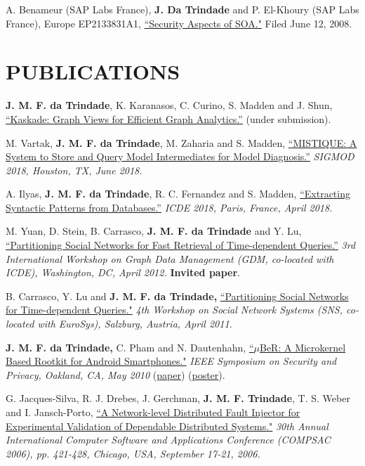 \documentclass[line,margin]{res}
\begin{document}
\begin{resume}
A. Benameur (SAP Labs France), \textbf{J. Da Trindade} and P. El-Khoury (SAP Labs France), Europe EP2133831A1, \href{http://www.freepatentsonline.com/EP2133831B1.html}{``Security Aspects of SOA."}  Filed June 12, 2008.

\section{PUBLICATIONS}
\textbf{J. M. F. da Trindade}, K. Karanasos, C. Curino, S. Madden and J. Shun, \href{https://arxiv.org/abs/1906.05162}{``Kaskade: Graph Views for Efficient Graph Analytics.''} (under submission).

M. Vartak, \textbf{J. M. F. da Trindade}, M. Zaharia and S. Madden, \href{https://cs.stanford.edu/~matei/papers/2018/sigmod_mistique.pdf}{``MISTIQUE: A System to Store and Query Model Intermediates for Model Diagnosis.''} \textit{SIGMOD 2018, Houston, TX, June 2018.}

A. Ilyas, \textbf{J. M. F. da Trindade}, R. C. Fernandez and S. Madden, \href{https://arxiv.org/pdf/1710.11528.pdf}{``Extracting Syntactic Patterns from Databases.''} \textit{ICDE 2018, Paris, France, April 2018.}

M. Yuan, D. Stein, B. Carrasco, \textbf{J. M. F. da Trindade} and Y. Lu, \href{http://joanatrindade.wdfiles.com/local--files/curriculum/gdm2012-paper.pdf}{``Partitioning Social Networks for Fast Retrieval of Time-dependent Queries.''} \textit{3rd International Workshop on Graph Data Management (GDM, co-located with ICDE), Washington, DC, April 2012.} \textbf{Invited paper}.

B. Carrasco, Y. Lu and \textbf{J. M. F. da Trindade,} \href{http://research.microsoft.com/en-us/projects/ldg/a04-carrasco.pdf}{``Partitioning Social Networks for Time-dependent Queries."} \textit{4th Workshop on Social Network Systems (SNS, co-located with EuroSys), Salzburg, Austria, April 2011.}

\textbf{J. M. F. da Trindade,} C. Pham and N. Dautenhahn, \href{http://joanatrindade.wikidot.com/local--files/curriculum/oakland2010-paper.pdf}{``$\mu$BeR: A Microkernel Based Rootkit for Android Smartphones."} \textit{IEEE Symposium on Security and Privacy, Oakland, CA, May 2010} (\href{http://joanatrindade.wikidot.com/local--files/curriculum/oakland2010-paper.pdf}{paper}) (\href{http://joanatrindade.wikidot.com/local--files/curriculum/oakland2010-poster.pdf}{poster}).

G. Jacques-Silva, R. J. Drebes, J. Gerchman, \textbf{J. M. F. Trindade}, T. S. Weber and I. Jansch-Porto, \href{http://doi.ieeecomputersociety.org/10.1109/COMPSAC.2006.12}{``A Network-level Distributed Fault Injector for Experimental Validation of Dependable Distributed Systems."} \textit{30th Annual International Computer Software and Applications Conference (COMPSAC 2006), pp. 421-428, Chicago, USA, September 17-21, 2006.}


\end{resume}
\end{document}
